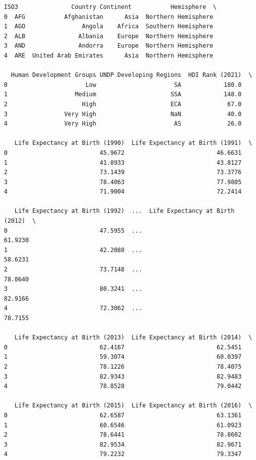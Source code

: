 \documentclass[twocolumn, switch]{article}
\begin{document}
\begin{verbatim}
ISO3               Country Continent           Hemisphere  \
0  AFG           Afghanistan      Asia  Northern Hemisphere   
1  AGO                Angola    Africa  Southern Hemisphere   
2  ALB               Albania    Europe  Northern Hemisphere   
3  AND               Andorra    Europe  Northern Hemisphere   
4  ARE  United Arab Emirates      Asia  Northern Hemisphere   

  Human Development Groups UNDP Developing Regions  HDI Rank (2021)  \
0                      Low                      SA            180.0   
1                   Medium                     SSA            148.0   
2                     High                     ECA             67.0   
3                Very High                     NaN             40.0   
4                Very High                      AS             26.0   

   Life Expectancy at Birth (1990)  Life Expectancy at Birth (1991)  \
0                          45.9672                          46.6631   
1                          41.8933                          43.8127   
2                          73.1439                          73.3776   
3                          78.4063                          77.9805   
4                          71.9004                          72.2414   

   Life Expectancy at Birth (1992)  ...  Life Expectancy at Birth (2012)  \
0                          47.5955  ...                          61.9230   
1                          42.2088  ...                          58.6231   
2                          73.7148  ...                          78.0640   
3                          80.3241  ...                          82.9166   
4                          72.3062  ...                          78.7155   

   Life Expectancy at Birth (2013)  Life Expectancy at Birth (2014)  \
0                          62.4167                          62.5451   
1                          59.3074                          60.0397   
2                          78.1226                          78.4075   
3                          82.9343                          82.9483   
4                          78.8528                          79.0442   

   Life Expectancy at Birth (2015)  Life Expectancy at Birth (2016)  \
0                          62.6587                          63.1361   
1                          60.6546                          61.0923   
2                          78.6441                          78.8602   
3                          82.9534                          82.9671   
4                          79.2232                          79.3347   


\end{verbatim}
\end{document}
